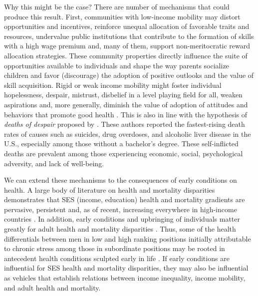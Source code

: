 \documentclass[class=article, crop=false, 12pt]{standalone}
\begin{document}
Why this might be the case? There are number of mechanisms that could produce this result. First, communities with low-income mobility may distort opportunities and incentives, reinforce unequal allocation of favorable traits and resources, undervalue public institutions that contribute to the formation of skills with a high wage premium and, many of them, support non-meritocratic reward allocation strategies. These community properties directly influence the suite of opportunities available to individuals and shape the way parents socialize children and favor (discourage) the adoption of positive outlooks and the value of skill acquisition. Rigid or weak income mobility might foster individual hopelessness, despair, mistrust, disbelief in a level playing field for all, weaken aspirations and, more generally, diminish the value of adoption of attitudes and behaviors that promote good health \citep{schilbach2016}. This is also in line with the hypothesis of \textit{deaths of despair} proposed by \citet{case2020}. These authors  reported the fastest-rising death rates of causes such as suicides, drug overdoses, and alcoholic liver disease in the U.S., especially among those without a bachelor's degree. These self-inflicted deaths are prevalent among those experiencing economic, social, psychological adversity, and lack of well-being.


We can extend these mechanisms to the consequences of early conditions on health. A large body of literature on health and mortality disparities demonstrates that SES (income, education) health and mortality gradients are pervasive, persistent and, as of recent, increasing everywhere in high-income countries \citep{mackenbach2012,meara2008}. In addition, early conditions and upbringing of individuals matter greatly for adult health and mortality disparities \citep{palloni2009,case2002}. Thus, some of the health differentials between men in low and high ranking positions initially attributable to chronic stress among those in subordinate positions \citep{marmot2004, sapolsky2005} may be rooted in antecedent health conditions sculpted early in life \citep{case2011}. If early conditions are influential for SES health and mortality disparities, they may also be influential as vehicles that establish relations between income inequality, income mobility, and adult health and mortality.
\end{document}
